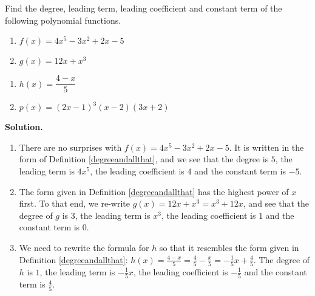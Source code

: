 \begin{ex}  Find the degree, leading term, leading coefficient and constant term of the following polynomial functions.

\begin{multicols}{2}
\begin{enumerate}

\item  $f(x) = 4x^5 - 3x^2 + 2x - 5$
\item $g(x) = 12x +x^3$

\setcounter{HW}{\value{enumi}}
\end{enumerate}
\end{multicols}

\begin{multicols}{2}
\begin{enumerate}
\setcounter{enumi}{\value{HW}}

\item  $h(x) = \dfrac{4-x}{5}$
\item  $p(x) = (2x-1)^{3}(x-2)(3x+2)$ 

\end{enumerate}
\end{multicols}

\smallskip

{\bf Solution.}  

\begin{enumerate}

\item  There are no surprises with $f(x) = 4x^5 - 3x^2 + 2x - 5$.  It is written in the form of Definition \ref{degreeandallthat}, and we see that the degree is $5$, the leading term is $4x^5$, the leading coefficient is $4$ and the constant term is $-5$.

\item The form given in Definition \ref{degreeandallthat} has the highest power of $x$ first.  To that end, we re-write $g(x) = 12x +x^3 = x^3+12x$, and see that the degree of $g$ is $3$, the leading term is $x^3$, the leading coefficient is $1$ and the constant term is $0$.

\item  We need to rewrite the formula for $h$ so that it resembles the form given in Definition \ref{degreeandallthat}:  $h(x) = \frac{4-x}{5} = \frac{4}{5} - \frac{x}{5} = -\frac{1}{5} x + \frac{4}{5}$.  The degree of $h$ is $1$, the leading term is $-\frac{1}{5} x$, the leading coefficient is $-\frac{1}{5}$ and the constant term is $\frac{4}{5}$.


\end{enumerate}
\end{ex}
